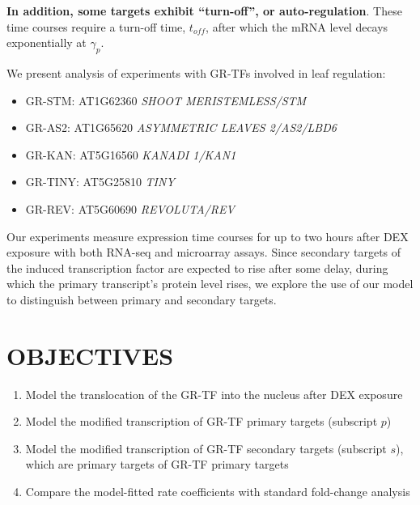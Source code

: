 \documentclass[aspb,landscape]{a0poster}
\begin{document}
\begin{multicols}{3}
{    \textbf{In addition, some targets exhibit ``turn-off'', or auto-regulation}. These time courses require a turn-off time, $t_{off}$, after which the mRNA level decays exponentially at $\gamma_p$.
    
    We present analysis of experiments with GR-TFs involved in leaf regulation:
    \begin{itemize}
    \item GR-STM: AT1G62360 \textit{SHOOT MERISTEMLESS/STM}
    \item GR-AS2: AT1G65620 \textit{ASYMMETRIC LEAVES 2/AS2/LBD6}
    \item GR-KAN: AT5G16560 \textit{KANADI 1/KAN1}
    \item GR-TINY: AT5G25810 \textit{TINY}
    \item GR-REV: AT5G60690 \textit{REVOLUTA/REV}
    \end{itemize}
    
    Our experiments measure expression time courses for up to two hours after DEX exposure with both RNA-seq and microarray assays.
    Since secondary targets of the induced transcription factor are expected to rise after some delay, during which the primary transcript's protein level rises,
    we explore the use of our model to distinguish between primary and secondary targets.

  }


  \section*{OBJECTIVES}
  \color{CarnegiePriBlue}  

  {
    \begin{enumerate}
    \item Model the translocation of the GR-TF into the nucleus after DEX exposure
    \item Model the modified transcription of GR-TF primary targets (subscript $p$)
    \item Model the modified transcription of GR-TF secondary targets (subscript $s$), which are primary targets of GR-TF primary targets
    \item Compare the model-fitted rate coefficients with standard fold-change analysis
    \end{enumerate}
  }


\end{multicols}
\end{document}
